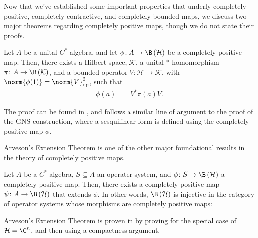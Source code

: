 Now that we've established some important properties that underly completely positive, completely contractive, and completely bounded maps, we discuss two major theorems regarding completely positive maps, though we do not state their proofs.
\begin{theorem}\label{thm:stinespring_dilation}
  Let $A$ be a unital $C^{\ast}$-algebra, and let $\phi\colon A\rightarrow \B\left( \mathcal{H} \right)$ be a completely positive map. Then, there exists a Hilbert space, $\mathcal{K}$, a unital $\ast$-homomorphism $\pi\colon A\rightarrow \B\left( \mathcal{K} \right)$, and a bounded operator $V\colon \mathcal{H}\rightarrow \mathcal{K}$, with $\norm{\phi(1)} = \norm{V}_{\op}^2$, such that
  \begin{align*}
    \phi(a) &= V^{\ast}\pi(a)V.
  \end{align*}
\end{theorem}
The proof can be found in \cite[Chapter 4]{completely_bounded_maps_and_operator_algebras}, and follows a similar line of argument to the proof of the GNS construction, where a sesquilinear form is defined using the completely positive map $\phi$.\newline

Arveson's Extension Theorem is one of the other major foundational results in the theory of completely positive maps.
\begin{theorem}
  Let $A$ be a $C^{\ast}$-algebra, $S\subseteq A$ an operator system, and $\phi\colon S\rightarrow \B\left( \mathcal{H} \right)$ a completely positive map. Then, there exists a completely positive map $\psi\colon A\rightarrow \B\left( \mathcal{H} \right)$ that extends $\phi$. In other words, $\B\left( \mathcal{H} \right)$ is injective in the category of operator systems whose morphisms are completely positive maps:
  \begin{center}
  \end{center}
\end{theorem}
Arveson's Extension Theorem is proven in \cite[Chapter 7]{completely_bounded_maps_and_operator_algebras} by proving for the special case of $\mathcal{H} = \C^n$, and then using a compactness argument.\newline

